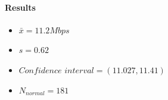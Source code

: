 \documentclass[aps,letterpaper,10pt]{revtex4}
\begin{document}
            \paragraph{Results}
                \begin{itemize}
                    \item $\bar{x} = 11.2 Mbps$
                    \item $s = 0.62$
                    \item $Confidence$ $interval =(11.027 , 11.41) $
                    \item $N_{normal} = 181$
                \end{itemize}
            \vspace{3mm}           
             \begin{figure}[htp]
                \begin{center}
                \end{center}    
            \end{figure}   
            \vspace{3mm}
\end{document}

